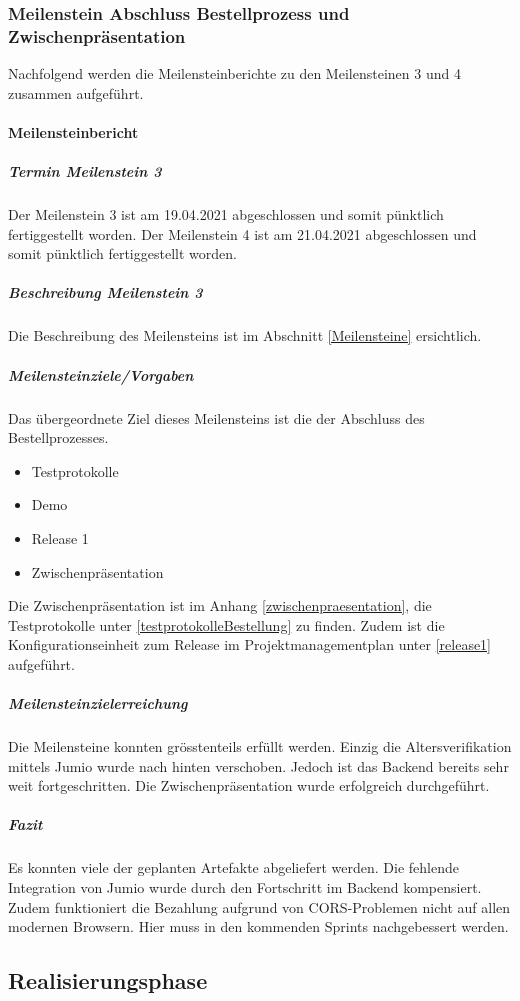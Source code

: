 \subsubsection{Meilenstein Abschluss Bestellprozess und Zwischenpräsentation}
Nachfolgend werden die Meilensteinberichte zu den Meilensteinen 3 und 4 zusammen aufgeführt. 
 \paragraph{Meilensteinbericht}
 \subparagraph{Termin Meilenstein 3}
 Der Meilenstein 3 ist am 19.04.2021 abgeschlossen und somit pünktlich fertiggestellt worden.
 Der Meilenstein 4 ist am 21.04.2021 abgeschlossen und somit pünktlich fertiggestellt worden. 
 \subparagraph{Beschreibung Meilenstein 3}
 Die Beschreibung des Meilensteins ist im Abschnitt \ref{Meilensteine} ersichtlich. 
 \subparagraph{Meilensteinziele/Vorgaben}
Das übergeordnete Ziel dieses Meilensteins ist die der Abschluss des Bestellprozesses. 
 \begin{itemize}
 	\item Testprotokolle
 	\item Demo
 	\item Release 1
 	\item Zwischenpräsentation
 \end{itemize}
Die Zwischenpräsentation ist im Anhang \ref{zwischenpraesentation}, die Testprotokolle unter \ref{testprotokolleBestellung} zu finden. Zudem ist die Konfigurationseinheit zum Release im Projektmanagementplan unter \ref{release1} aufgeführt. 
 \subparagraph{Meilensteinzielerreichung}
Die Meilensteine konnten grösstenteils erfüllt werden. Einzig die Altersverifikation mittels Jumio wurde nach hinten verschoben. Jedoch ist das Backend bereits sehr weit fortgeschritten.  
Die Zwischenpräsentation wurde erfolgreich durchgeführt. 
 \subparagraph{Fazit}
Es konnten viele der geplanten Artefakte abgeliefert werden. Die fehlende Integration von Jumio wurde durch den Fortschritt im Backend kompensiert. Zudem funktioniert die Bezahlung aufgrund von \ac{CORS}-Problemen nicht auf allen modernen Browsern. Hier muss in den kommenden Sprints nachgebessert werden. 

\subsection{Realisierungsphase}
